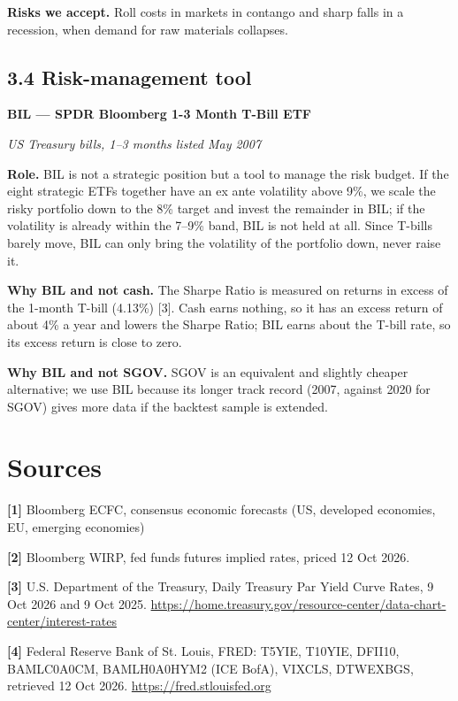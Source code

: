 \documentclass[
]{article}
\begin{document}
\textbf{Risks we accept.} Roll costs in markets in contango and sharp
falls in a recession, when demand for raw materials collapses.

\hypertarget{risk-management-tool}{%
\subsection{3.4 Risk-management tool}\label{risk-management-tool}}

\textbf{BIL --- SPDR Bloomberg 1-3 Month T-Bill ETF}

\emph{US Treasury bills, 1--3 months \textperiodcentered{} listed May 2007}

\textbf{Role.} BIL is not a strategic position but a tool to manage the
risk budget. If the eight strategic ETFs together have an ex ante
volatility above 9\%, we scale the risky portfolio down to the 8\%
target and invest the remainder in BIL; if the volatility is already
within the 7--9\% band, BIL is not held at all. Since T-bills barely
move, BIL can only bring the volatility of the portfolio down, never
raise it.

\textbf{Why BIL and not cash.} The Sharpe Ratio is measured on returns
in excess of the 1-month T-bill (4.13\%) {[}3{]}. Cash earns nothing, so
it has an excess return of about \textminus{}4\% a year and lowers the Sharpe
Ratio; BIL earns about the T-bill rate, so its excess return is close to
zero.

\textbf{Why BIL and not SGOV.} SGOV is an equivalent and slightly
cheaper alternative; we use BIL because its longer track record (2007,
against 2020 for SGOV) gives more data if the backtest sample is
extended.

\hypertarget{sources}{%
\section{Sources}\label{sources}}

\textbf{{[}1{]}} Bloomberg ECFC, consensus economic forecasts (US,
developed economies, EU, emerging economies)

\textbf{{[}2{]}} Bloomberg WIRP, fed funds futures implied rates, priced
12 Oct 2026.

\textbf{{[}3{]}} U.S. Department of the Treasury, Daily Treasury Par
Yield Curve Rates, 9 Oct 2026 and 9 Oct 2025.
\url{https://home.treasury.gov/resource-center/data-chart-center/interest-rates}

\textbf{{[}4{]}} Federal Reserve Bank of St. Louis, FRED: T5YIE, T10YIE,
DFII10, BAMLC0A0CM, BAMLH0A0HYM2 (ICE BofA), VIXCLS, DTWEXBGS, retrieved
12 Oct 2026. \url{https://fred.stlouisfed.org}
\end{document}
